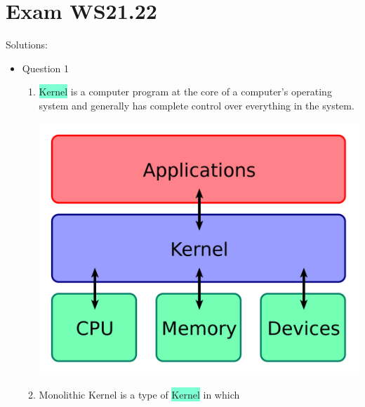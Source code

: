 \documentclass{article}
\begin{document}
\section{Exam WS21.22}
Solutions:

\begin{itemize}
    \item Question 1
    \begin{enumerate}
        \item \colorbox{Aquamarine}{Kernel} is a computer program at the core of a computer's operating system and generally has complete control over everything in the system.
        
        \includegraphics[width=.43\textwidth]{img/Kernel1.png}

        \item \colorbox{BurntOrange}{Monolithic Kernel}  is a type of \colorbox{Aquamarine}{Kernel} in which 

        
    \end{enumerate}
\end{itemize}

    
\end{document}
